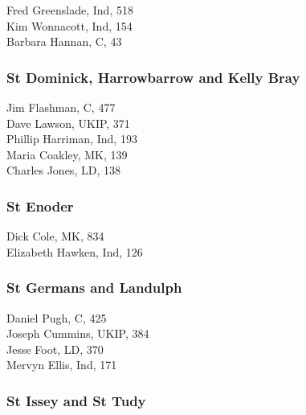 \documentclass[a4paper,openany,10pt]{book}
\begin{document}


Fred Greenslade, Ind, 518\\
Kim Wonnacott, Ind, 154\\
Barbara Hannan, C, 43\\


\subsubsection*{St Dominick, Harrowbarrow and Kelly Bray}



Jim Flashman, C, 477\\
Dave Lawson, UKIP, 371\\
Phillip Harriman, Ind, 193\\
Maria Coakley, MK, 139\\
Charles Jones, LD, 138\\


\subsubsection*{St Enoder}



Dick Cole, MK, 834\\
Elizabeth Hawken, Ind, 126\\


\subsubsection*{St Germans and Landulph}



Daniel Pugh, C, 425\\
Joseph Cummins, UKIP, 384\\
Jesse Foot, LD, 370\\
Mervyn Ellis, Ind, 171\\


\subsubsection*{St Issey and St Tudy}

\end{document}
